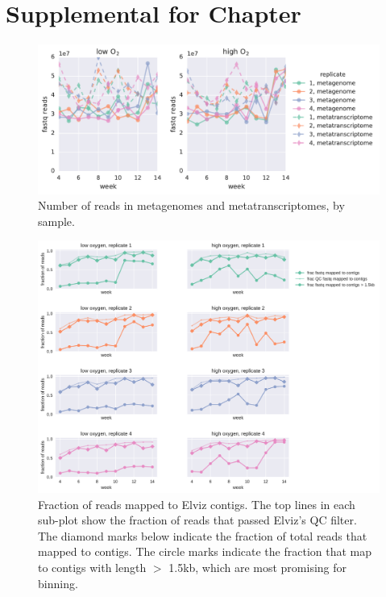 \chapter{Supplemental for Chapter }

\begin{figure}[H]
\centering
    \includegraphics[width=1.0\textwidth]{./tex/chapter2/figures/170326_compare_raw_fastq_reads.pdf}
    \begin{singlespace}
    \caption[Number of reads in metagenomes and metatranscriptomes, by sample]{
        Number of reads in metagenomes and metatranscriptomes, by sample.}
    \label{fig:fastq_reads}
    \end{singlespace}
\end{figure}

\begin{figure}[H]
\centering
    \includegraphics[width=1.0\textwidth]{./tex/chapter2/figures/170314_mapping_fractions--portrait.pdf}
    \begin{singlespace}
    \caption[Fraction of reads mapped to Elviz contigs]{
        Fraction of reads mapped to Elviz contigs.
        The top lines in each sub-plot show the fraction of reads that passed Elviz's QC filter.
        The diamond marks below indicate the fraction of total reads that mapped to contigs.
        The circle marks indicate the fraction that map to contigs with length $>$ 1.5kb, which are most promising for binning.
        }
    \label{fig:frac_elviz_mapped_to_contigs}
    \end{singlespace}
\end{figure}

